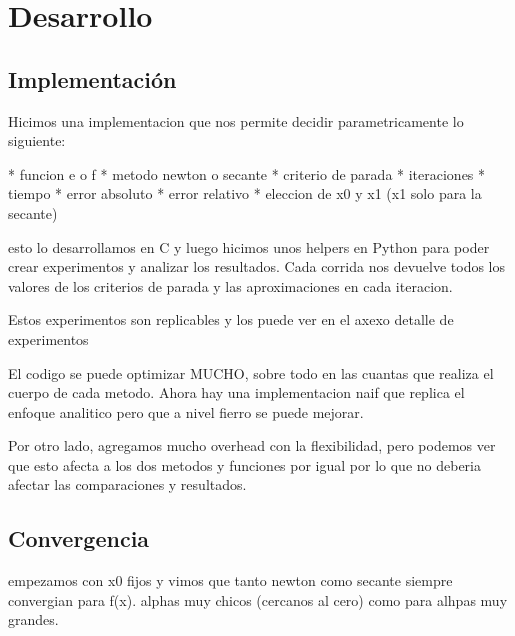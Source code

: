 \newpage \section{Desarrollo}

\subsection{Implementación}

Hicimos una implementacion que nos permite decidir parametricamente lo siguiente:

* funcion e o f
* metodo newton o secante
* criterio de parada
  * iteraciones
  * tiempo
  * error absoluto
  * error relativo
* eleccion de x0 y x1 (x1 solo para la secante)

esto lo desarrollamos en C y luego hicimos unos helpers en Python para poder
crear experimentos y analizar los resultados. Cada corrida nos devuelve todos
los valores de los criterios de parada y las aproximaciones en cada iteracion.

Estos experimentos son replicables y los puede ver en el axexo {detalle de experimentos}

El codigo se puede optimizar MUCHO, sobre todo en las cuantas que realiza el
cuerpo de cada metodo. Ahora hay una implementacion naif que replica el enfoque
analitico pero que a nivel fierro se puede mejorar.

Por otro lado, agregamos mucho overhead con la flexibilidad, pero podemos ver
que esto afecta a los dos metodos y funciones por igual por lo que no deberia
afectar las comparaciones y resultados.

\subsection{Convergencia}

empezamos con x0 fijos y vimos que tanto newton como secante siempre convergian
para f(x). %
alphas muy chicos (cercanos al cero) como para alhpas muy grandes.

